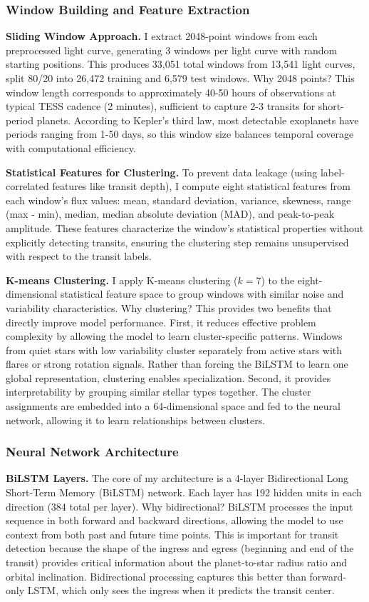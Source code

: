 \documentclass[letterpaper]{article} %
\begin{document}
\subsubsection{Window Building and Feature Extraction}
\textbf{Sliding Window Approach.} I extract 2048-point windows from each preprocessed light curve, generating 3 windows per light curve with random starting positions. This produces 33,051 total windows from 13,541 light curves, split 80/20 into 26,472 training and 6,579 test windows. Why 2048 points? This window length corresponds to approximately 40-50 hours of observations at typical TESS cadence (2 minutes), sufficient to capture 2-3 transits for short-period planets. According to Kepler's third law, most detectable exoplanets have periods ranging from 1-50 days, so this window size balances temporal coverage with computational efficiency.

\textbf{Statistical Features for Clustering.} To prevent data leakage (using label-correlated features like transit depth), I compute eight statistical features from each window's flux values: mean, standard deviation, variance, skewness, range (max - min), median, median absolute deviation (MAD), and peak-to-peak amplitude. These features characterize the window's statistical properties without explicitly detecting transits, ensuring the clustering step remains unsupervised with respect to the transit labels.

\textbf{K-means Clustering.} I apply K-means clustering ($k=7$) to the eight-dimensional statistical feature space to group windows with similar noise and variability characteristics. Why clustering? This provides two benefits that directly improve model performance. First, it reduces effective problem complexity by allowing the model to learn cluster-specific patterns. Windows from quiet stars with low variability cluster separately from active stars with flares or strong rotation signals. Rather than forcing the BiLSTM to learn one global representation, clustering enables specialization. Second, it provides interpretability by grouping similar stellar types together. The cluster assignments are embedded into a 64-dimensional space and fed to the neural network, allowing it to learn relationships between clusters.

\subsubsection{Neural Network Architecture}
\textbf{BiLSTM Layers.} The core of my architecture is a 4-layer Bidirectional Long Short-Term Memory (BiLSTM) network. Each layer has 192 hidden units in each direction (384 total per layer). Why bidirectional? BiLSTM processes the input sequence in both forward and backward directions, allowing the model to use context from both past and future time points. This is important for transit detection because the shape of the ingress and egress (beginning and end of the transit) provides critical information about the planet-to-star radius ratio and orbital inclination. Bidirectional processing captures this better than forward-only LSTM, which only sees the ingress when it predicts the transit center.
\end{document}
